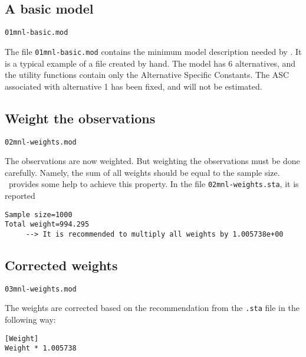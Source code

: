\documentclass[12pt]{memoir}
\begin{document}
\subsection{A basic model}
\begin{flushright}
\verb+01mnl-basic.mod+
\end{flushright}

The file \verb+01mnl-basic.mod+ contains the minimum model description needed
by \BIOGEME. It is a typical example of a file created by hand. The
model has 6 alternatives, and the utility functions contain only the
Alternative Specific Constants. The ASC associated with alternative 1
has been fixed, and will not be estimated.



\subsection{Weight the observations}
\begin{flushright}
\verb+02mnl-weights.mod+
\end{flushright}

The observations are now weighted. But weighting the observations must
be done carefully. Namely, the sum of all weights should be equal  to
the sample size. \BIOGEME\ provides some help to achieve this
property. In the file \verb+02mnl-weights.sta+, it is reported
\small
{\footnotesize
\begin{verbatim}
Sample size=1000
Total weight=994.295
     --> It is recommended to multiply all weights by 1.005738e+00
\end{verbatim}
}
\normalsize

\subsection{Corrected weights}
\begin{flushright}
\verb+03mnl-weights.mod+
\end{flushright}
The weights are corrected based on the recommendation from the
\verb+.sta+ file in the following way:
\small
{\footnotesize
\begin{verbatim}
[Weight]
Weight * 1.005738
\end{verbatim}
}
\normalsize
\end{document}
